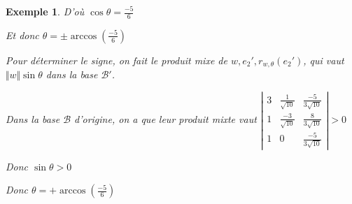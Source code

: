 \documentclass[a4paper,12pt]{book}
\newtheorem{Exe}{Exemple}[section]
\begin{document}
\begin{Exe}
\par D'où $\cos\theta = \frac{-5}{6}$
\par Et donc $\theta=\pm\arccos\left(\frac{-5}{6}\right)$
\par Pour déterminer le signe, on fait le produit mixe de $w, e_2', r_{w, \theta}(e_2')$, qui vaut $\Vert w\Vert\sin \theta$ dans la base $\mathcal{B}'$.
\par Dans la base $\mathcal{B}$ d'origine, on a que leur produit mixte vaut $\left\vert\begin{matrix} 3 & \frac{1}{\sqrt{10}} & \frac{-5}{3\sqrt{10}} \\ 1 & \frac{-3}{\sqrt{10}} & \frac{8}{3\sqrt{10}} \\ 1 & 0 & \frac{-5}{3\sqrt{10}}\end{matrix}\right\vert>0$
\par Donc $\sin\theta>0$
\par Donc $\theta = +\arccos\left(\frac{-5}{6}\right)$
\end{Exe}
\end{document}
